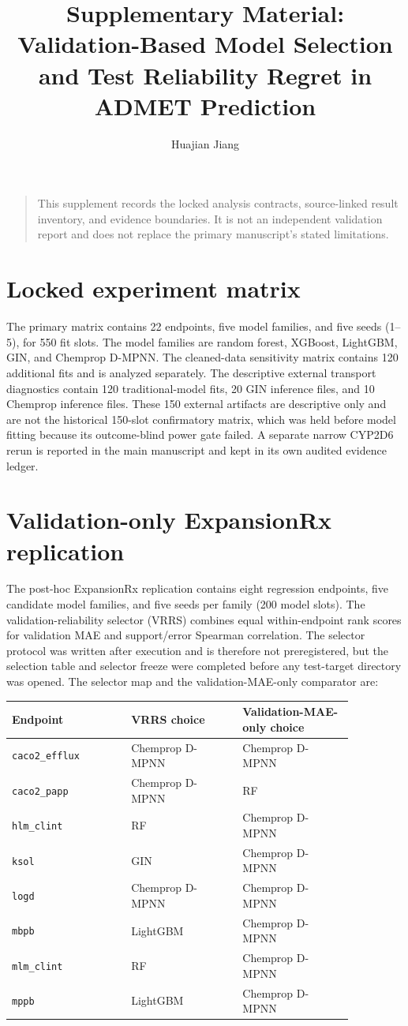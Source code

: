 \documentclass[11pt]{article}
\title{Supplementary Material: Validation-Based Model Selection and Test Reliability Regret in ADMET Prediction}
\author{Huajian Jiang}
\date{}
\begin{document}
\maketitle

\begin{quote}
This supplement records the locked analysis contracts, source-linked result
inventory, and evidence boundaries. It is not an independent validation report
and does not replace the primary manuscript's stated limitations.
\end{quote}

\section{Locked experiment matrix}
The primary matrix contains 22 endpoints, five model families, and five seeds
(1--5), for 550 fit slots. The model families are random forest, XGBoost,
LightGBM, GIN, and Chemprop D-MPNN. The cleaned-data sensitivity matrix contains
120 additional fits and is analyzed separately. The descriptive external
transport diagnostics contain 120 traditional-model fits, 20 GIN inference
files, and 10 Chemprop inference files. These 150 external artifacts are
descriptive only and are not the historical 150-slot confirmatory matrix,
which was held before model fitting because its outcome-blind power gate failed.
A separate narrow CYP2D6 rerun is
reported in the main manuscript and kept in its own audited evidence ledger.

\section{Validation-only ExpansionRx replication}
The post-hoc ExpansionRx replication contains eight regression endpoints, five
candidate model families, and five seeds per family (200 model slots). The
validation-reliability selector (VRRS) combines equal within-endpoint rank scores
for validation MAE and support/error Spearman correlation. The selector protocol
was written after execution and is therefore not preregistered, but the selection
table and selector freeze were completed before any test-target directory was
opened. The selector map and the validation-MAE-only comparator are:

\begin{longtable}{p{0.30\linewidth}p{0.28\linewidth}p{0.28\linewidth}}
\toprule
Endpoint & VRRS choice & Validation-MAE-only choice \\
\midrule
\texttt{caco2\_efflux} & Chemprop D-MPNN & Chemprop D-MPNN \\
\texttt{caco2\_papp} & Chemprop D-MPNN & RF \\
\texttt{hlm\_clint} & RF & Chemprop D-MPNN \\
\texttt{ksol} & GIN & Chemprop D-MPNN \\
\texttt{logd} & Chemprop D-MPNN & Chemprop D-MPNN \\
\texttt{mbpb} & LightGBM & Chemprop D-MPNN \\
\texttt{mlm\_clint} & RF & Chemprop D-MPNN \\
\texttt{mppb} & LightGBM & Chemprop D-MPNN \\
\bottomrule
\end{longtable}
\end{document}
